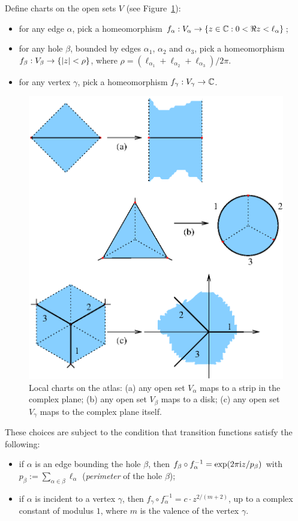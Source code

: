 Define charts on the open sets $V$ (see Figure~\ref{fig:charts}):
\begin{itemize}
\item for any edge $\alpha$, pick a homeomorphism $f_\alpha: V_\alpha \to \{ z \in \mathbb{C}
  : 0 < \Re z < \ell_\alpha \}$;
\item for any hole $\beta$, bounded by edges $\alpha_1$, $\alpha_2$ and $\alpha_3$,
  pick a homeomorphism $f_\beta: V_\beta \to \{ \lvert z\rvert < \rho \}$, where $\rho =
  (\ell_{\alpha_1} + \ell_{\alpha_2} + \ell_{\alpha_3}) / 2\pi$.
\item for any vertex $\gamma$, pick a homeomorphism $f_\gamma: V_\gamma \to \mathbb{C}$.
\end{itemize}
\begin{figure}[htbp]
  \centering\includegraphics{charts}
  \caption{Local charts on the atlas: (a) any open set $V_\alpha$
    maps to a strip in the complex plane; (b) any open set $V_\beta$
    maps to a disk; (c) any open set $V_\gamma$ maps to the complex
    plane itself.}
  \label{fig:charts}
\end{figure}
These choices are subject to the condition that transition functions
satisfy the following:
\begin{itemize}
\item if $\alpha$ is an edge bounding the hole $\beta$, then $f_\beta \circ
  f_\alpha^{-1} = \exp (2\pi\mathrm{i} z / p_\beta)$ with $p_\beta := \sum_{\alpha \in \beta} \ell_\alpha$
  (\emph{perimeter} of the hole $\beta$);
\item if $\alpha$ is incident to a vertex $\gamma$, then $f_\gamma \circ f_\alpha^{-1} =
  c \cdot z^{2/(m+2)}$, up to a complex constant of modulus $1$, where
  $m$ is the valence of the vertex $\gamma$.
\end{itemize}

